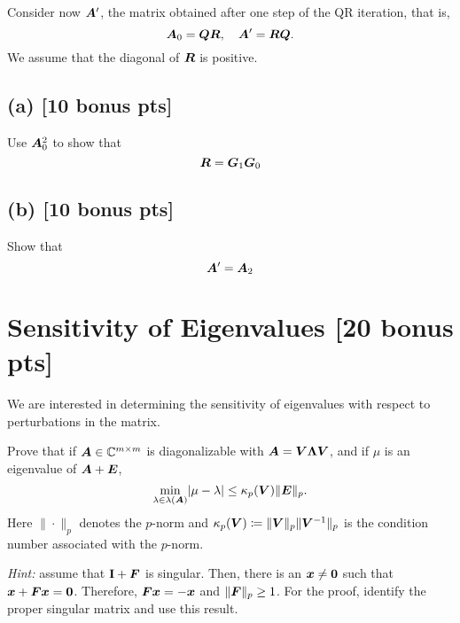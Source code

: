 \documentclass[twoside,10pt]{article}
\begin{document}
Consider now $\bm{A}'$, the matrix obtained after one step of the QR iteration, that is, 
\begin{equation}
  \bm{A}_0 = \bm{Q}\bm{R}, \quad \bm{A}' = \bm{R} \bm{Q}.
\end{equation}
We assume that the diagonal of $\bm{R}$ is positive.

\subsection*{(a) [10 bonus pts]}
Use $\bm{A}_0^2$ to show that 
\begin{equation}
  \bm{R} = \bm{G}_1 \bm{G}_0
\end{equation}

\subsection*{(b) [10 bonus pts]}
Show that
\begin{equation}
  \bm{A}' = \bm{A}_2
\end{equation}
   
\section{Sensitivity of Eigenvalues [20 bonus pts]}
We are interested in determining the sensitivity of eigenvalues with respect to perturbations in the matrix.

Prove that if $\bm{A} \in \mathbb{C}^{m \times m}$ is diagonalizable with $\bm{A} = \bm{V} \bm{\Lambda} \bm{V}$, and if $\mu$ is an eigenvalue of $\bm{A} + \bm{E}$, 
\begin{equation}
  \min \limits_{\lambda \in \lambda(\mtx{A})}  \left|\mu -\lambda \right| \leq \kappa_p(\mtx{V}) \|\mtx{E}\|_p.
\end{equation}
Here $\|\cdot\|_p$ denotes the $p$-norm and $\kappa_p(\bm{V}) \coloneqq \|\bm{V}\|_p \|\bm{V}^{-1}\|_p$ is the condition number associated with the $p$-norm. 

\emph{Hint:} assume that $\mathbf{I} + \bm{F}$ is singular. Then, there is an $\bm{x} \neq \bm{0}$ such that $\bm{x} + \bm{F}\bm{x} = \bm{0}$. Therefore, $\bm{F} \bm{x} = -\bm{x}$ and $\|\bm{F}\|_{p} \geq 1$. 
For the proof, identify the proper singular matrix and use this result. 
\end{document}
